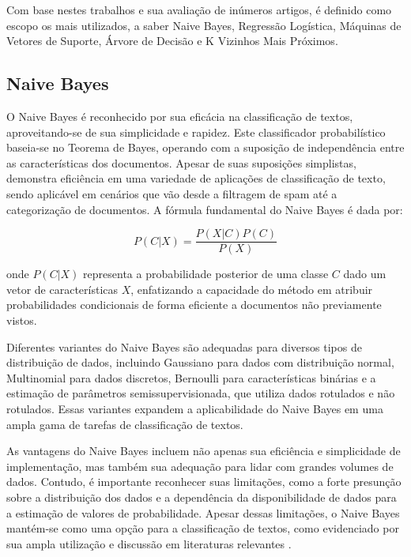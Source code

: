 Com base nestes trabalhos e sua avaliação de inúmeros artigos, é definido como escopo os mais utilizados, a saber Naive Bayes, Regressão Logística, Máquinas de Vetores de Suporte, Árvore de Decisão e K Vizinhos Mais Próximos.

\subsection{Naive Bayes}

O Naive Bayes é reconhecido por sua eficácia na classificação de textos, aproveitando-se de sua simplicidade e rapidez. Este classificador probabilístico baseia-se no Teorema de Bayes, operando com a suposição de independência entre as características dos documentos. Apesar de suas suposições simplistas, demonstra eficiência em uma variedade de aplicações de classificação de texto, sendo aplicável em cenários que vão desde a filtragem de spam até a categorização de documentos. A fórmula fundamental do Naive Bayes é dada por:

\begin{equation}
P(C|X) = \frac{P(X|C)P(C)}{P(X)}
\end{equation}

onde \(P(C|X)\) representa a probabilidade posterior de uma classe \(C\) dado um vetor de características \(X\), enfatizando a capacidade do método em atribuir probabilidades condicionais de forma eficiente a documentos não previamente vistos.

Diferentes variantes do Naive Bayes são adequadas para diversos tipos de distribuição de dados, incluindo Gaussiano para dados com distribuição normal, Multinomial para dados discretos, Bernoulli para características binárias e a estimação de parâmetros semissupervisionada, que utiliza dados rotulados e não rotulados. Essas variantes expandem a aplicabilidade do Naive Bayes em uma ampla gama de tarefas de classificação de textos.

As vantagens do Naive Bayes incluem não apenas sua eficiência e simplicidade de implementação, mas também sua adequação para lidar com grandes volumes de dados. Contudo, é importante reconhecer suas limitações, como a forte presunção sobre a distribuição dos dados e a dependência da disponibilidade de dados para a estimação de valores de probabilidade. Apesar dessas limitações, o Naive Bayes mantém-se como uma opção para a classificação de textos, como evidenciado por sua ampla utilização e discussão em literaturas relevantes \cite{gasparetto2022survey, aggarwal2012survey, kowsari2019text}.

